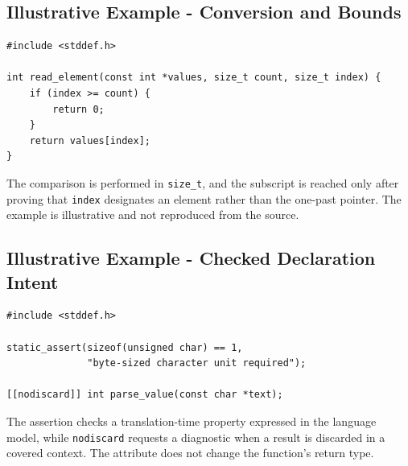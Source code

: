 \documentclass[10pt,letterpaper]{article}
\begin{document}
\subsection{Illustrative Example - Conversion and Bounds}
\begin{verbatim}
#include <stddef.h>

int read_element(const int *values, size_t count, size_t index) {
    if (index >= count) {
        return 0;
    }
    return values[index];
}
\end{verbatim}
The comparison is performed in \texttt{size\_t}, and the subscript is reached only after proving that \texttt{index} designates an element rather than the one-past pointer. The example is illustrative and not reproduced from the source.



\subsection{Illustrative Example - Checked Declaration Intent}
\begin{verbatim}
#include <stddef.h>

static_assert(sizeof(unsigned char) == 1,
              "byte-sized character unit required");

[[nodiscard]] int parse_value(const char *text);
\end{verbatim}
The assertion checks a translation-time property expressed in the language model, while \texttt{nodiscard} requests a diagnostic when a result is discarded in a covered context. The attribute does not change the function's return type.
\end{document}
